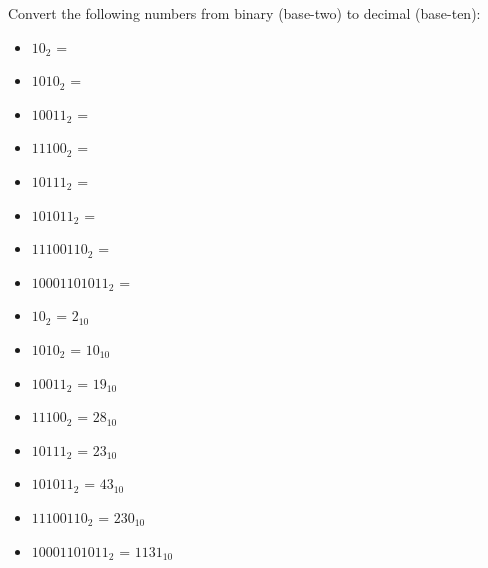 

Convert the following numbers from binary (base-two) to decimal (base-ten):

\begin{itemize}
\item{} $10_2$ =
\vskip 5pt
\item{} $1010_2$ =
\vskip 5pt
\item{} $10011_2$ =
\vskip 5pt
\item{} $11100_2$ = 
\vskip 5pt
\item{} $10111_2$ = 
\vskip 5pt
\item{} $101011_2$ = 
\vskip 5pt
\item{} $11100110_2$ = 
\vskip 5pt
\item{} $10001101011_2$ = 
\end{itemize}

\vfil

\eject






\begin{itemize}
\item{} $10_2$ = $2_{10}$
\vskip 5pt
\item{} $1010_2$ = $10_{10}$
\vskip 5pt
\item{} $10011_2$ = $19_{10}$
\vskip 5pt
\item{} $11100_2$ =  $28_{10}$
\vskip 5pt
\item{} $10111_2$ =  $23_{10}$
\vskip 5pt
\item{} $101011_2$ =  $43_{10}$
\vskip 5pt
\item{} $11100110_2$ = $230_{10}$
\vskip 5pt
\item{} $10001101011_2$ = $1131_{10}$ 
\end{itemize}











